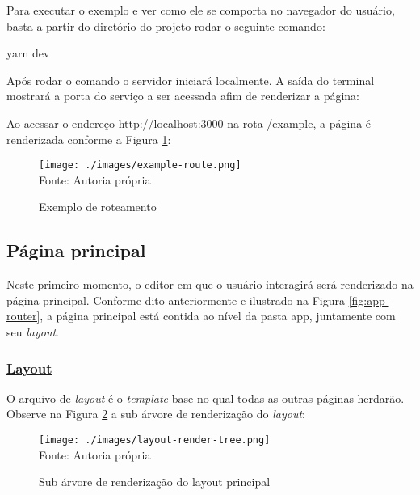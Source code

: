 Para executar o exemplo e ver como ele se comporta no navegador
do usuário, basta a partir do diretório do projeto rodar o
seguinte comando:

\begin{9d650bc32cca47779480805017f968f7}
yarn dev
\end{9d650bc32cca47779480805017f968f7}

Após rodar o comando o servidor iniciará localmente.
A saída do terminal mostrará a porta do serviço a ser acessada
afim de renderizar a página:


Ao acessar o endereço http://localhost:3000
na rota /example, a página é renderizada
conforme a
Figura \ref{fig:example-route}:

\begin{figure}[H]
    \centering
    \caption{Exemplo de roteamento}
    \texttt{[image: ./images/example-route.png]}
    \label{fig:example-route} \\
    \textnormal{\fontsize{10pt}{12pt}Fonte: Autoria própria}
\end{figure}

\subsection{Página principal}

Neste primeiro momento, o editor em que o usuário interagirá
será renderizado na página principal. Conforme dito anteriormente
e ilustrado na
Figura \ref{fig:app-router},
a página principal está contida ao nível da pasta app, juntamente com
seu \textit{layout}.

\subsubsection{\underline{Layout}}

O arquivo de \textit{layout} é o \textit{template} base no qual todas as outras páginas herdarão.
Observe na
Figura \ref{fig:layout-render-tree}
a sub árvore de renderização do \textit{layout}:

\begin{figure}[H]
    \centering
    \caption{Sub árvore de renderização do layout principal}
    \texttt{[image: ./images/layout-render-tree.png]}
    \label{fig:layout-render-tree} \\
    \textnormal{\fontsize{10pt}{12pt}Fonte: Autoria própria}
\end{figure}

